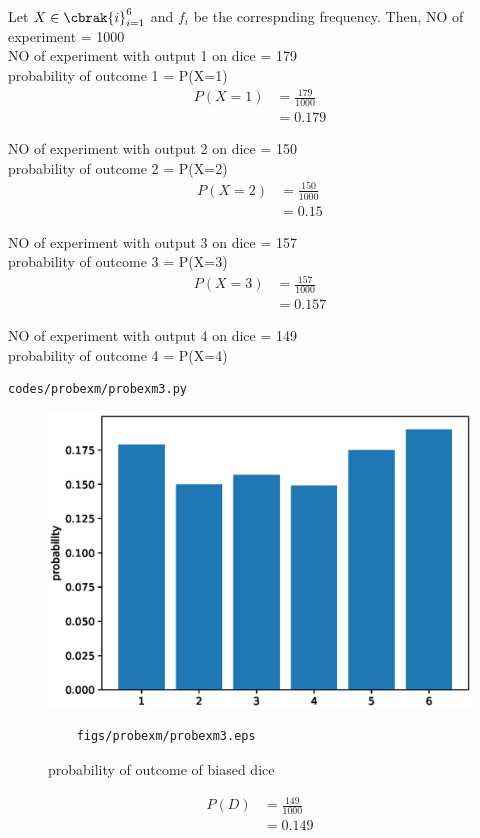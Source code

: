 Let $X \in \cbrak{i}_{i=1}^{6}$ and $f_i$ be the correspnding frequency.  Then, 
 NO of experiment = 1000
\\
NO of experiment with output 1 on dice = 179
\\
probability of outcome 1 = P(X=1)
\begin{align}
P\left(X=1\right) &= \frac{179}{1000}
\\
&= 0.179
\end{align}

NO of experiment with output 2 on dice = 150
\\
probability of outcome 2 = P(X=2)
\begin{align}
P\left(X=2\right) &= \frac{150}{1000}
\\
&= 0.15
\end{align}

NO of experiment with output 3 on dice = 157
\\
probability of outcome 3 = P(X=3)
\begin{align}
P\left(X=3\right) &= \frac{157}{1000}
\\
&= 0.157
\end{align}

NO of experiment with output 4 on dice = 149
\\
probability of outcome 4 = P(X=4)
\begin{lstlisting}
codes/probexm/probexm3.py
\end{lstlisting}
\begin{figure}[!ht]
	\centering
	\includegraphics[width=\columnwidth]{./figures/probexm/probexm3.eps}
	\caption{probability of outcome of biased dice }
	\label{fig:bts3}
	\begin{lstlisting}
	figs/probexm/probexm3.eps
	\end{lstlisting}
\end{figure}
\begin{align}
P\left(D\right) &= \frac{149}{1000}
\\
&= 0.149
\end{align}

